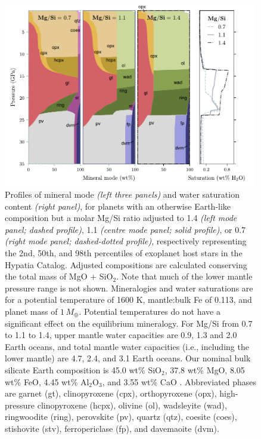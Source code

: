 \documentclass[fleqn,usenatbib]{mnras}
\begin{document}
\begin{figure}
         \centering
         \includegraphics[width=0.99\textwidth]{phase_demo_ver.pdf}
        \caption{Profiles of mineral mode \textit{(left three panels)} and water saturation content \textit{(right panel)}, for planets with an otherwise Earth-like composition but a molar Mg/Si ratio adjusted to 1.4 \textit{(left mode panel; dashed profile)}, 1.1 \textit{(centre mode panel; solid profile)}, or 0.7 \textit{(right mode panel; dashed-dotted profile)}, respectively representing the 2nd, 50th, and 98th percentiles of exoplanet host stars in the Hypatia Catalog. Adjusted compositions are calculated conserving the total mass of MgO + SiO$_2$. Note that much of the lower mantle pressure range is not shown. Mineralogies and water saturations are for a potential temperature of 1600 K, mantle:bulk Fe of 0.113, and planet mass of $1\,M_\oplus$. Potential temperatures do not have a significant effect on the equilibrium mineralogy. For Mg/Si from 0.7 to 1.1 to 1.4, upper mantle water capacities are 0.9, 1.3 and 2.0 Earth oceans, and total mantle water capacities (i.e., including the lower mantle) are 4.7, 2.4, and 3.1 Earth oceans. Our nominal bulk silicate Earth composition is 45.0 wt\% SiO$_2$, 37.8 wt\% MgO, 8.05 wt\% FeO, 4.45 wt\% Al$_2$O$_3$, and 3.55 wt\% CaO \citep{mcdonough_composition_1995}. Abbreviated phases are garnet (gt), clinopyroxene (cpx), orthopyroxene (opx), high-pressure clinopyroxene (hcpx),  olivine (ol), wadsleyite (wad), ringwoodite (ring), perovskite (pv), quartz (qtz), coesite (coes), stishovite (stv), ferropericlase (fp), and davemaoite (dvm).}
        \label{fig:mgsi_modality}
\end{figure}
\end{document}
